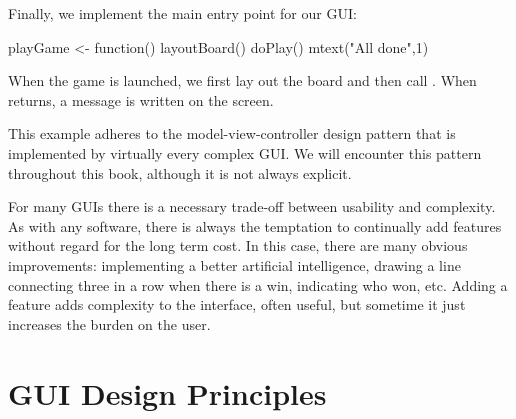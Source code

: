 Finally, we implement the main entry point for our GUI:
\begin{Schunk}
\begin{Sinput}
 playGame <- function() {
   layoutBoard()
   doPlay()
   mtext("All done\n",1)
 }
\end{Sinput}
\end{Schunk}
%
When the game is launched, we first lay out the board and then call
. When  returns, a message is written
on the screen.

This example adheres to the model-view-controller design pattern that
is implemented by virtually every complex GUI. We will encounter this
pattern throughout this book, although it is not always explicit.

For many GUIs there is a necessary trade-off between usability and
complexity. As with any software, there is always the temptation to
continually add features without regard for the long term cost. In
this case, there are many obvious improvements: implementing a better
artificial intelligence, drawing a line connecting three in a row when
there is a win, indicating who won, etc. Adding a feature adds
complexity to the interface, often useful, but sometime it just
increases the burden on the user.

\section{GUI Design Principles}
\label{sec:GUI:design}






